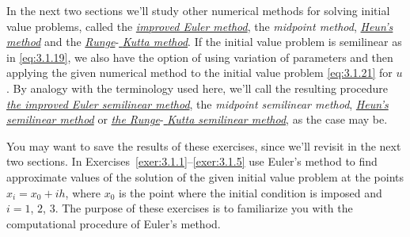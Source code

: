 In the next two sections we'll study other numerical methods for solving initial value problems,
called the
\href{https://mathshistory.st-andrews.ac.uk/Biographies/Euler/}{\color{blue}
\it improved Euler method\/}, the {\color{blue}\it midpoint method\/},
\href{https://mathshistory.st-andrews.ac.uk/Biographies/Heun/}{\color{blue}
\it Heun's method}
and the
\href{https://mathshistory.st-andrews.ac.uk/Biographies/Runge/}{\color{blue}
\it Runge}-\href{https://mathshistory.st-andrews.ac.uk/Biographies/Kutta/}{\it
\color{blue}
Kutta method\/}. If the initial value problem is semilinear as in \eqref{eq:3.1.19}, we also have
the option of using variation of parameters and then applying the given numerical method to the
initial value problem \eqref{eq:3.1.21} for $u$. By analogy with the terminology used here, we'll
call the resulting procedure
\href{https://mathshistory.st-andrews.ac.uk/Biographies/Euler/}{\color{blue}
\it the improved Euler semilinear method}, the \emph{\color{blue}
midpoint semilinear method}, \href{https://mathshistory.st-andrews.ac.uk/Biographies/Heun/}{\it
\color{blue}
Heun's semilinear method} or
\href{https://mathshistory.st-andrews.ac.uk/Biographies/Runge/}{\color{blue}
\it the Runge}-\href{https://mathshistory.st-andrews.ac.uk/Biographies/Kutta/}{\it
\color{blue}
Kutta semilinear method\/}, as the case may be.

\exercises You may want to save the results of these exercises, since we'll revisit in the next two sections. In Exercises~\ref{exer:3.1.1}--\ref{exer:3.1.5} use Euler's method to find approximate values of the solution of the given initial value problem at the points $x_{i}=x_{0}+ih$, where $x_{0}$ is the point where the initial condition is imposed and $i=1$, $2$, $3$. The purpose of these exercises is to familiarize you with the computational procedure of Euler's method.

